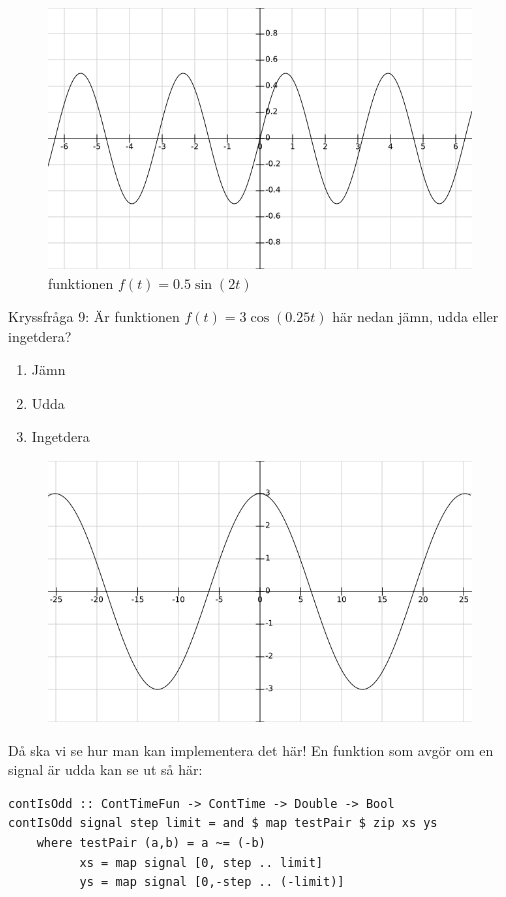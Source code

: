 \documentclass{article}
\begin{document}
\begin{figure}[ht]
\centerline{\includegraphics[scale=0.50]{image08.png}}
\caption{funktionen $f(t) = 0.5 \sin(2t)$}
\label{}
\end{figure}

\newpage

Kryssfråga 9: Är funktionen $f(t)=3\cos(0.25t)$ här nedan jämn, udda eller ingetdera?
\begin{enumerate}[label={\alph*)},font={\bfseries}]
    \item Jämn
    \item Udda
    \item Ingetdera
\end{enumerate}

\begin{figure}[ht]
\centerline{\includegraphics[scale=0.50]{image11.png}}
\caption{}
\label{}
\end{figure}

Då ska vi se hur man kan implementera det här! En funktion som avgör om en
signal är udda kan se ut så här:
\begin{verbatim}
contIsOdd :: ContTimeFun -> ContTime -> Double -> Bool
contIsOdd signal step limit = and $ map testPair $ zip xs ys
    where testPair (a,b) = a ~= (-b)
          xs = map signal [0, step .. limit]
          ys = map signal [0,-step .. (-limit)]
\end{verbatim}
\end{document}
